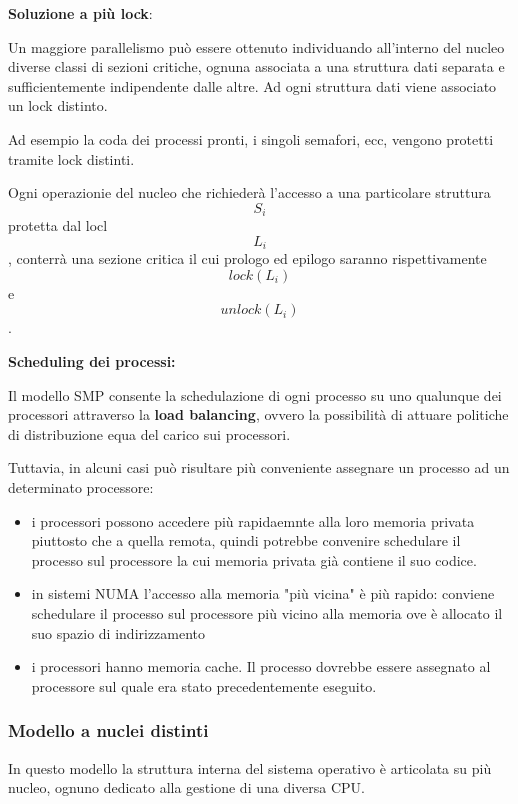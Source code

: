 \documentclass{article}
\begin{document}
\vspace{3mm}
\textbf{Soluzione a più lock}:

Un maggiore parallelismo può essere ottenuto individuando all'interno del nucleo diverse classi di sezioni critiche, ognuna associata a una struttura dati
separata e sufficientemente indipendente dalle altre. Ad ogni struttura dati viene associato un lock distinto.

Ad esempio la coda dei processi pronti, i singoli semafori, ecc, vengono protetti tramite lock distinti.

Ogni operazionie del nucleo che richiederà l'accesso a una particolare struttura $$S_i$$ protetta dal locl $$L_i$$, conterrà una sezione critica
il cui prologo ed epilogo saranno rispettivamente $$lock(L_i)$$ e $$unlock(L_i)$$.

\vspace{3mm}
\textbf{Scheduling dei processi:}

Il modello SMP consente la schedulazione di ogni processo su uno qualunque dei processori attraverso la \textbf{load balancing}, ovvero la possibilità di
attuare politiche di distribuzione equa del carico sui processori.

Tuttavia, in alcuni casi può risultare più conveniente assegnare un processo ad un determinato processore:
\begin{itemize}
    \item i processori possono accedere più rapidaemnte alla loro memoria privata piuttosto che a quella remota, quindi potrebbe convenire schedulare il processo
    sul processore la cui memoria privata già contiene il suo codice.
    \item in sistemi NUMA l'accesso alla memoria "più vicina" è più rapido: conviene schedulare il processo sul processore più vicino alla memoria ove
    è allocato il suo spazio di indirizzamento
    \item i processori hanno memoria cache. Il processo dovrebbe essere assegnato al processore sul quale era stato precedentemente eseguito.
\end{itemize}

\subsubsection{Modello a nuclei distinti}

In questo modello la struttura interna del sistema operativo è articolata su più nucleo, ognuno dedicato alla gestione di una diversa CPU.
\end{document}
